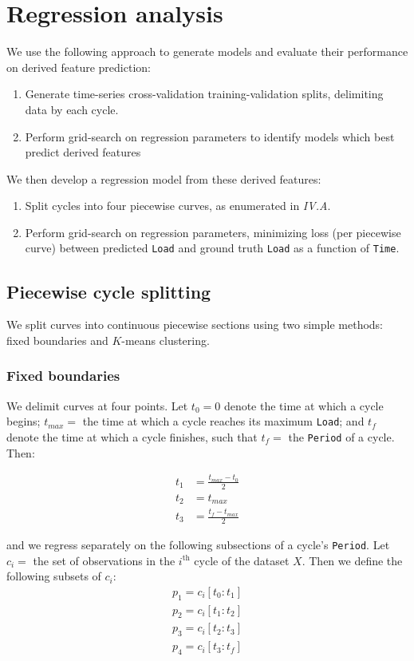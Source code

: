 \documentclass[letterpaper, 10 pt, conference]{ieeeconf}  %
\begin{document}
\section{Regression analysis}
We use the following approach to generate models and evaluate their performance on derived feature prediction:
\begin{enumerate}
  \item Generate time-series cross-validation training-validation splits, delimiting data by each cycle.
  \item Perform grid-search on regression parameters to identify models which best predict derived features
\end{enumerate}

We then develop a regression model from these derived features:
\begin{enumerate}
  \item Split cycles into four piecewise curves, as enumerated in \textit{IV.A}.
  \item Perform grid-search on regression parameters, minimizing loss (per piecewise curve) between predicted \verb|Load| and ground truth \verb|Load| as a function of \verb|Time|. 
\end{enumerate}

\subsection{Piecewise cycle splitting}\label{ssec:Piecewise}
We split curves into continuous piecewise sections using two simple methods: fixed boundaries and $K$-means clustering.

\subsubsection{Fixed boundaries}
We delimit curves at four points. Let $t_0 = 0$ denote the time at which a cycle begins; $t_{max} =$ the time at which a cycle reaches its maximum \verb|Load|; and $t_f$ denote the time at which a cycle finishes, such that $t_f =$ the \verb|Period| of a cycle. Then:

\begin{align*}
  t_1 &= \frac{t_{max} - t_0}{2} \\
  t_2 &= t_{max} \\
  t_3 &= \frac{t_f - t_{max}}{2}
\end{align*}

and we regress separately on the following subsections of a cycle's \verb|Period|. Let $c_i=$ the set of observations in the $i^{\text{th}}$ cycle of the dataset $X$. Then we define the following subsets of $c_i$:
\begin{align*}
  p_1 = c_i[t_0:t_1] \\
  p_2 = c_i[t_1:t_2] \\
  p_3 = c_i[t_2:t_3] \\
  p_4 = c_i[t_3:t_f]
\end{align*}
\end{document}
